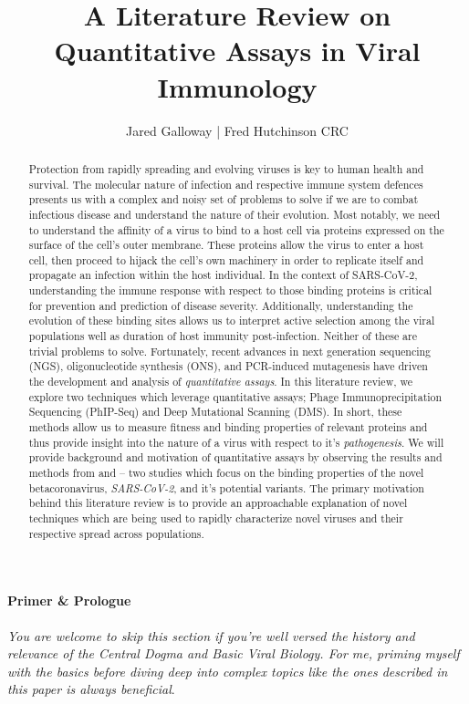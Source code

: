 \documentclass{article}
\title{A Literature Review on Quantitative Assays in Viral Immunology}
\author{Jared Galloway | Fred Hutchinson CRC}
\begin{document}
\maketitle

\begin{abstract}
Protection from rapidly spreading and evolving viruses is key to human health and survival.
The molecular nature of infection and respective immune system defences presents us with a complex and noisy set of problems to solve if we are to combat infectious disease and understand the nature of their evolution.
Most notably, we need to understand the affinity of a virus to bind to a host cell via proteins expressed on the surface of the cell's outer membrane.
These proteins allow the virus to enter a host cell, then proceed to hijack the cell's own machinery in order to replicate itself and propagate an infection within the host individual.
In the context of SARS-CoV-2, understanding the immune response with respect to those binding proteins is critical for prevention and prediction of disease severity.
Additionally, understanding the evolution of these binding sites allows us to interpret active selection among the viral populations well as duration of host immunity post-infection.
Neither of these are trivial problems to solve.
Fortunately, recent advances in next generation sequencing (NGS), oligonucleotide synthesis (ONS), and PCR-induced mutagenesis have driven the development and analysis of \textit{quantitative assays}. 
In this literature review, we explore two techniques which leverage quantitative assays; Phage Immunoprecipitation Sequencing (PhIP-Seq) and Deep Mutational Scanning (DMS).
In short, these methods allow us to measure fitness and binding properties of relevant proteins and thus provide insight into the nature of a virus with respect to it's \textit{pathogenesis}.
We will provide background and motivation of quantitative assays by observing the results and methods from \citet{Shrock2020} and \citet{Starr2020} -- 
two studies which focus on the binding properties of the novel betacoronavirus, \textit{SARS-CoV-2}, and it's potential variants.
The primary motivation behind this literature review is to provide an approachable explanation of novel techniques which are being used to rapidly characterize novel viruses and their respective spread across populations.
\end{abstract}

\paragraph{Primer \& Prologue}
\textit{You are welcome to skip this section if you're well versed the history and relevance of the Central Dogma and Basic Viral Biology. 
For me, priming myself with the basics before diving deep into complex topics like the ones described in this paper is always beneficial}.
\end{document}
